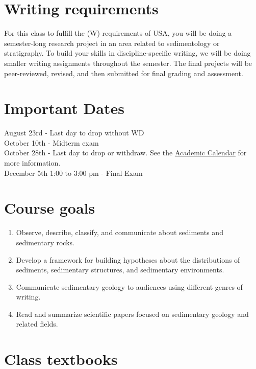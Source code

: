 \documentclass[11pt,]{article}
\begin{document}
\hypertarget{writing-requirements}{%
\section{Writing requirements}\label{writing-requirements}}

For this class to fulfill the (W) requirements of USA, you will be doing
a semester-long research project in an area related to sedimentology or
stratigraphy. To build your skills in discipline-specific writing, we
will be doing smaller writing assignments throughout the semester. The
final projects will be peer-reviewed, revised, and then submitted for
final grading and assessment.

\hypertarget{important-dates}{%
\section{Important Dates}\label{important-dates}}

August 23rd - Last day to drop without WD\\
October 10th - Midterm exam\\
October 28th - Last day to drop or withdraw. See the
\href{https://www.southalabama.edu/academiccalendar/}{Academic Calendar}
for more information.\\
December 5th 1:00 to 3:00 pm - Final Exam

\newpage

\hypertarget{course-goals}{%
\section{Course goals}\label{course-goals}}

\begin{enumerate}
\def\labelenumi{\arabic{enumi}.}
\item
  Observe, describe, classify, and communicate about sediments and
  sedimentary rocks.
\item
  Develop a framework for building hypotheses about the distributions of
  sediments, sedimentary structures, and sedimentary environments.
\item
  Communicate sedimentary geology to audiences using different genres of
  writing.
\item
  Read and summarize scientific papers focused on sedimentary geology
  and related fields.
\end{enumerate}

\hypertarget{class-textbooks}{%
\section{Class textbooks}\label{class-textbooks}}
\end{document}
